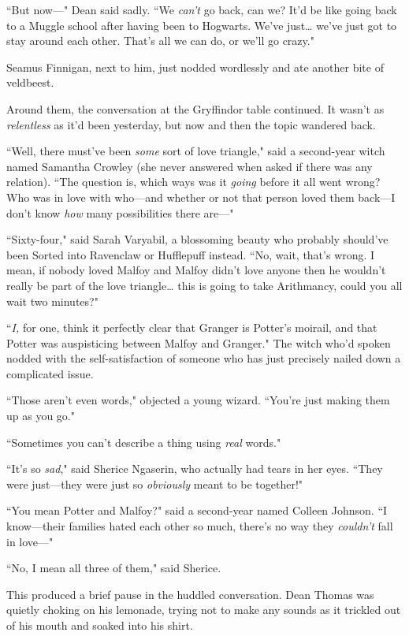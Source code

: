 ``But now—" Dean said sadly. ``We \emph{can't} go back, can we? It'd be like going back to a Muggle school after having been to Hogwarts. We've just{\ldots} we've just got to stay around each other. That's all we can do, or we'll go crazy."

Seamus Finnigan, next to him, just nodded wordlessly and ate another bite of veldbeest.

Around them, the conversation at the Gryffindor table continued. It wasn't as \emph{relentless} as it'd been yesterday, but now and then the topic wandered back.

``Well, there must've been \emph{some} sort of love triangle," said a second-year witch named Samantha Crowley (she never answered when asked if there was any relation). ``The question is, which ways was it \emph{going} before it all went wrong? Who was in love with who—and whether or not that person loved them back—I don't know \emph{how} many possibilities there are—"

``Sixty-four," said Sarah Varyabil, a blossoming beauty who probably should've been Sorted into Ravenclaw or Hufflepuff instead. ``No, wait, that's wrong. I mean, if nobody loved Malfoy and Malfoy didn't love anyone then he wouldn't really be part of the love triangle{\ldots} this is going to take Arithmancy, could you all wait two minutes?"

``\emph{I,} for one, think it perfectly clear that Granger is Potter's moirail, and that Potter was auspisticing between Malfoy and Granger." The witch who'd spoken nodded with the self-satisfaction of someone who has just precisely nailed down a complicated issue.

``Those aren't even words," objected a young wizard. ``You're just making them up as you go."

``Sometimes you can't describe a thing using \emph{real} words."

``It's so \emph{sad}," said Sherice Ngaserin, who actually had tears in her eyes. ``They were just—they were just so \emph{obviously} meant to be together!"

``You mean Potter and Malfoy?" said a second-year named Colleen Johnson. ``I know—their families hated each other so much, there's no way they \emph{couldn't} fall in love—"

``No, I mean all three of them," said Sherice.

This produced a brief pause in the huddled conversation. Dean Thomas was quietly choking on his lemonade, trying not to make any sounds as it trickled out of his mouth and soaked into his shirt.


